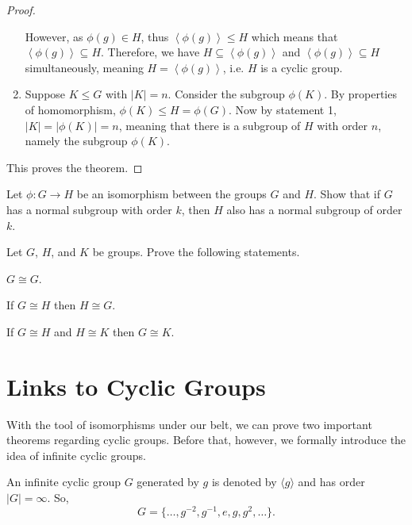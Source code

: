\begin{proof}
\begin{enumerate}
        However, as $\phi(g) \in H$, thus $\left\langle \phi(g) \right\rangle \leq H$ which means that $\left\langle \phi(g) \right\rangle \subseteq H$. Therefore, we have $H \subseteq \left\langle \phi(g) \right\rangle$ and $\left\langle \phi(g) \right\rangle \subseteq H$ simultaneously, meaning $H = \left\langle \phi(g) \right\rangle$, i.e. $H$ is a cyclic group.

        \item Suppose $K \leq G$ with $|K| = n$. Consider the subgroup $\phi(K)$. By properties of homomorphism, $\phi(K) \leq H = \phi(G)$. Now by statement 1, $|K| = |\phi(K)| = n$, meaning that there is a subgroup of $H$ with order $n$, namely the subgroup $\phi(K)$.
    \end{enumerate}

    This proves the theorem.
\end{proof}

\begin{exercise}
    Let $\phi: G \to H$ be an isomorphism between the groups $G$ and $H$. Show that if $G$ has a normal subgroup with order $k$, then $H$ also has a normal subgroup of order $k$.
\end{exercise}

\begin{exercise}
    Let $G$, $H$, and $K$ be groups. Prove the following statements.
    \begin{partquestions}{\alph*}
        \item $G \cong G$.
        \item If $G \cong H$ then $H \cong G$.
        \item If $G \cong H$ and $H \cong K$ then $G \cong K$.
    \end{partquestions}
\end{exercise}

\section{Links to Cyclic Groups}
With the tool of isomorphisms under our belt, we can prove two important theorems regarding cyclic groups. Before that, however, we formally introduce the idea of infinite cyclic groups.
\begin{definition}
    An infinite cyclic group $G$ generated by $g$ is denoted by $\langle g \rangle$ and has order $|G| = \infty$. So,
    \[
        G = \{\dots, g^{-2}, g^{-1}, e, g, g^2, \dots\}.
    \]
\end{definition}


